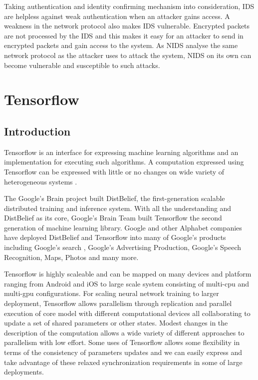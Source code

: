\documentclass[12pt, a4paper]{report}
\begin{document}
Taking authentication and identity confirming mechanism into consideration, IDS are helpless against weak authentication when an attacker gains access. A weakness in the network protocol also makes IDS vulnerable. Encrypted packets are not processed by the IDS and this makes it easy for an attacker to send in encrypted packets and gain access to the system. As NIDS analyse the same network protocol as the attacker uses to attack the system, NIDS on its own can become vulnerable and susceptible to such attacks. \cite{limitationOfIDS}
\clearpage



\chapter{Tensorflow}\label{sec:tensorflow}

\section{Introduction}\label{sec:tensor_intro}
\justify
Tensorflow is an interface for expressing machine learning algorithms and an implementation for executing such algorithms. A computation expressed using Tensorflow can be expressed with little or no changes on wide variety of heterogeneous systems \cite{tensorflow_paper}. \\ \par
\justify
The Google's Brain project built DistBelief, the first-generation scalable distributed training and inference system. With all the understanding and DistBelief as its core, Google's Brain Team built Tensorflow the second generation of machine learning library. Google and other Alphabet companies have deployed DistBelief and Tensorflow into many of Google's products including Google's search \cite{googleSearch}, Google's Advertising Production, Google's Speech Recognition, Maps, Photos and many more. \\ \par
\justify
Tensorflow is highly scaleable and can be mapped on many devices and platform ranging from Android and iOS to large scale system consisting of multi-cpu and multi-gpu configurations. For scaling neural network training to larger deployment, Tensorflow allows parallelism through replication and parallel execution of core model with different computational devices all collaborating to update a set of shared parameters or other states. Modest changes in the description of the computation allows a wide variety of different approaches to parallelism with low effort. Some uses of Tensorflow allows some flexibility in terms of the consistency of parameters updates and we can easily express and take advantage of these relaxed synchronization requirements in some of large deployments.\\ \par
\end{document}
